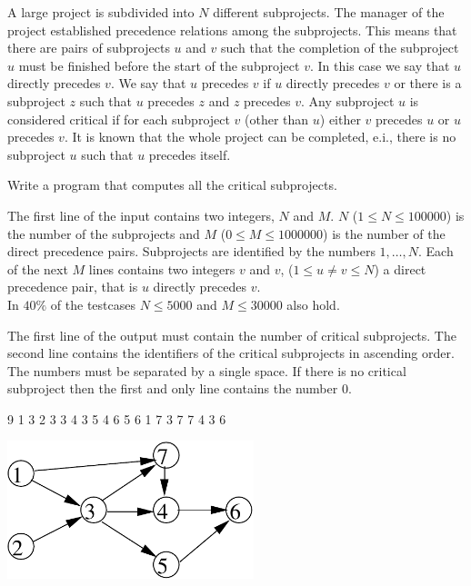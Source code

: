 





A large project is subdivided into $N$ different subprojects. The manager of the project established precedence relations among the subprojects. This means that there are pairs of subprojects $u$ and $v$ such that the completion of the subproject $u$ must be finished before the start of the subproject $v$. In this case we say that $u$ directly precedes $v$. We say that $u$ precedes $v$ if $u$ directly precedes $v$ or there is a subproject $z$ such that $u$ precedes $z$ and $z$ precedes $v$.
Any subproject $u$ is considered critical if for each subproject $v$ (other than $u$) either $v$ precedes $u$ or $u$ precedes $v$. It is known that the whole project can be completed, e.i., there is no subproject $u$ such that $u$ precedes itself.

Write a program that computes all the critical subprojects.

The first line of the input contains two integers, $N$ and $M$. $N$ ($1 \leq N \leq 100000$) is the number of the subprojects and $M$ ($0 \leq M \leq 1000000$) is the number of the direct precedence pairs. Subprojects are identified by the numbers $1, \ldots ,N$. Each of the next $M$ lines contains two integers $v$ and $v$, ($1 \leq u \neq v \leq N$) a direct precedence pair, that is $u$ directly precedes $v$.\\
\bigskip
In $40 \%$ of the testcases $N \leq 5000$ and $M \leq 30000$ also hold.

The first line of the output must contain the number of critical subprojects. The second line contains the identifiers of the critical subprojects in ascending order. The numbers must be separated by a single space. If there is no critical subproject then the first and only line contains the number 0.


 9
1 3
2 3
3 4
3 5
4 6
5 6
1 7
3 7
7 4
3 6
\sampleCOMMENT

\sampleEND

\includegraphics[height=4cm]{img/critical-fig.pdf}
\bigskip



